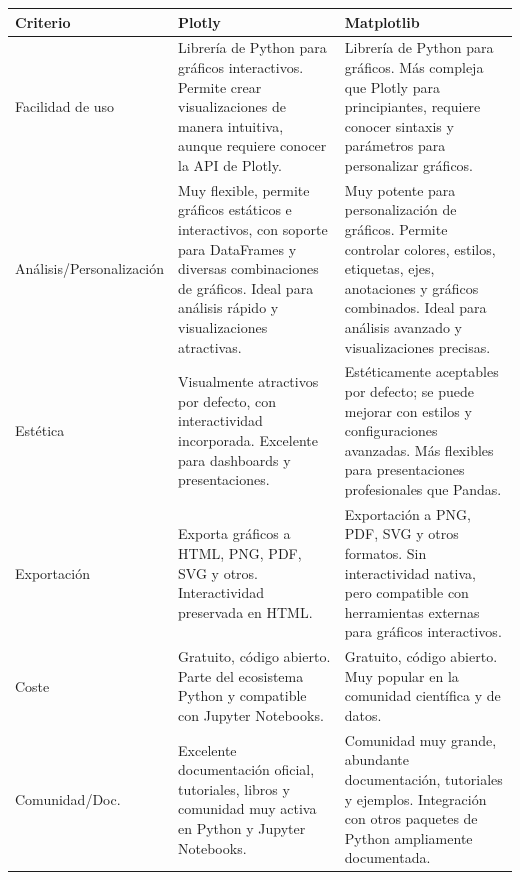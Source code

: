 \documentclass{../../miPlantilla}
\begin{document}
\begin{itemize}
    \begin{table}[H]
        \centering
        \scriptsize %
        \setlength{\tabcolsep}{4pt} %
        \renewcommand{\arraystretch}{1.3} %
        \begin{tabularx}{\textwidth}{
            >{\centering\arraybackslash}X
            >{\centering\arraybackslash}X
            >{\centering\arraybackslash}X
        }
            \toprule
            \rowcolor[HTML]{C0C0C0}
            \textbf{Criterio} & \textbf{Plotly} & \textbf{Matplotlib} \\ \midrule
            Facilidad de uso & Librería de Python para gráficos interactivos. Permite crear visualizaciones de manera intuitiva, aunque requiere conocer la API de Plotly. & Librería de Python para gráficos. Más compleja que Plotly para principiantes, requiere conocer sintaxis y parámetros para personalizar gráficos. \\
            \midrule
            Análisis/Personalización & Muy flexible, permite gráficos estáticos e interactivos, con soporte para DataFrames y diversas combinaciones de gráficos. Ideal para análisis rápido y visualizaciones atractivas. & Muy potente para personalización de gráficos. Permite controlar colores, estilos, etiquetas, ejes, anotaciones y gráficos combinados. Ideal para análisis avanzado y visualizaciones precisas. \\
            \midrule
            Estética & Visualmente atractivos por defecto, con interactividad incorporada. Excelente para dashboards y presentaciones. & Estéticamente aceptables por defecto; se puede mejorar con estilos y configuraciones avanzadas. Más flexibles para presentaciones profesionales que Pandas. \\
            \midrule
            Exportación & Exporta gráficos a HTML, PNG, PDF, SVG y otros. Interactividad preservada en HTML. & Exportación a PNG, PDF, SVG y otros formatos. Sin interactividad nativa, pero compatible con herramientas externas para gráficos interactivos. \\
            \midrule
            Coste & Gratuito, código abierto. Parte del ecosistema Python y compatible con Jupyter Notebooks. & Gratuito, código abierto. Muy popular en la comunidad científica y de datos. \\
            \midrule
            Comunidad/Doc. & Excelente documentación oficial, tutoriales, libros y comunidad muy activa en Python y Jupyter Notebooks. & Comunidad muy grande, abundante documentación, tutoriales y ejemplos. Integración con otros paquetes de Python ampliamente documentada. \\
            \bottomrule
        \end{tabularx}
    \end{table}


\end{itemize}
\end{document}
